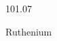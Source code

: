 \documentclass[12pt]{article}
\begin{document}
\hfill{}
\vfill
\begin{center}
  {\fontsize{50}{60}
  }

  \vspace{1em}

  101.07

Ruthenium
\end{center}
\vfill
\end{document}
